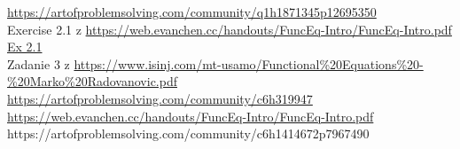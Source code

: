 
 \url{https://artofproblemsolving.com/community/q1h1871345p12695350} \\
 Exercise 2.1 z \url{https://web.evanchen.cc/handouts/FuncEq-Intro/FuncEq-Intro.pdf Ex 2.1} \\
 Zadanie 3 z \url{https://www.isinj.com/mt-usamo/Functional%20Equations%20-%20Marko%20Radovanovic.pdf} \\
 \url{https://artofproblemsolving.com/community/c6h319947} \\
 \url{https://web.evanchen.cc/handouts/FuncEq-Intro/FuncEq-Intro.pdf} \\
 {https://artofproblemsolving.com/community/c6h1414672p7967490} \\